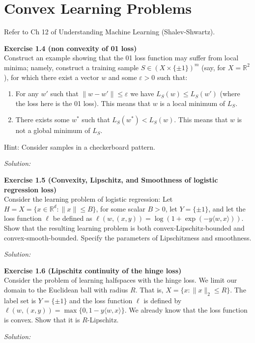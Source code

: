\documentclass[
  10pt, %
  a4paper, %
  oneside, %
  headinclude,footinclude, %
  BCOR5mm, %
]{scrartcl}
\newenvironment{problem}[2][]
{ \begin{mdframed}[backgroundcolor=gray!20] \textbf{#1 #2} \\}
    {  \end{mdframed}}
\newenvironment{solution}
{\textit{Solution:}}
{}
\begin{document}
\section{Convex Learning Problems}
Refer to Ch 12 of Understanding Machine Learning (Shalev-Shwartz).

\begin{problem}{Exercise 1.4 (non convexity of 0\textendash{}1 loss)}
Construct an example showing that the 0\textendash{}1 loss function may suffer from local minima; namely, construct a training sample $S \in {(X \times \{\pm1\})}^m$ (say, for $X = \mathbb{R}^2$), for which there exist a vector $w$ and some $\varepsilon > 0$ such that:
\begin{enumerate}

	\item For any $w'$ such that $\|w - w'\| \leq \varepsilon$ we have $L_S (w) \leq L_S (w')$ (where the loss here is the 0\textendash{}1 loss). This means that $w$ is a local minimum of $L_S$.
	\item There exists some $w^*$ such that $L_S (w^*) < L_S (w)$. This means that $w$ is not a global minimum of $L_S$.
\end{enumerate}

Hint: Consider samples in a checkerboard pattern.
\end{problem}

\begin{solution}

\end{solution}

\begin{problem}{Exercise 1.5 (Convexity, Lipschitz, and Smoothness of logistic regression loss)}
Consider the learning problem of logistic regression: Let $H = X = \{x \in \mathbb{R}^d : \|x\| \leq B\}$, for some scalar $B > 0$, let $Y = \{\pm1\}$, and let the loss function $\ell$ be defined as $\ell(w, (x, y)) = \log(1 + \exp(-y\langle w, x \rangle))$. Show that the resulting learning problem is both convex-Lipschitz-bounded and convex-smooth-bounded. Specify the parameters of Lipschitzness and smoothness.
\end{problem}

\begin{solution}

\end{solution}


\begin{problem}{Exercise 1.6 (Lipschitz continuity of the hinge loss)}
Consider the problem of learning halfspaces with the hinge loss. We limit our domain to the Euclidean ball with radius $R$. That is, $X = \{x : \|x\|_2 \leq R\}$. The label set is $Y = \{\pm1\}$ and the loss function $\ell$ is defined by $\ell(w, (x, y)) = \max\{0, 1 - y\langle w, x \rangle\}$. We already know that the loss function is convex. Show that it is $R$-Lipschitz.
\end{problem}

\begin{solution}

\end{solution}


\end{document}
